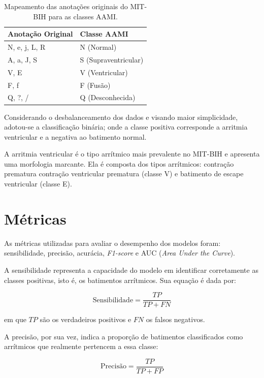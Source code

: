 \documentclass[
    12pt,                %
    openright,           %
    oneside,             %
    a4paper,             %
    brazil               %
]{abntex2}
\begin{document}
\begin{table}[H]
\centering
\caption{Mapeamento das anotações originais do MIT-BIH para as classes AAMI.}
\label{tab:mapeamento_classes}
\begin{tabular}{ll}
\hline
\textbf{Anotação Original} & \textbf{Classe AAMI} \\
\hline
N, e, j, L, R & N (Normal) \\
A, a, J, S & S (Supraventricular) \\
V, E & V (Ventricular) \\
F, f & F (Fusão) \\
Q, ?, / & Q (Desconhecida) \\
\hline
\end{tabular}
\end{table}


Considerando o desbalanceamento dos dados e visando maior simplicidade, adotou-se a classificação binária; onde a classe positiva corresponde a arritmia ventricular e a negativa ao batimento normal.

A arritmia ventricular é o tipo arrítmico mais prevalente no MIT-BIH e apresenta uma morfologia marcante. Ela é composta dos tipos arrítmicos: contração prematura
contração ventricular prematura (classe V) e batimento de escape ventricular (classe E).


\section{Métricas}
\label{sec:metricas}

As métricas utilizadas para avaliar o desempenho dos modelos foram: sensibilidade, precisão, acurácia, \textit{F1-score} e AUC (\textit{Area Under the Curve}).  

A sensibilidade representa a capacidade do modelo em identificar corretamente as classes positivas, isto é, os batimentos arrítmicos. Sua equação é dada por:

\begin{equation}
\text{Sensibilidade} = \frac{TP}{TP + FN}
\end{equation}

em que $TP$ são os verdadeiros positivos e $FN$ os falsos negativos.  

A precisão, por sua vez, indica a proporção de batimentos classificados como arrítmicos que realmente pertencem a essa classe:

\begin{equation}
\text{Precisão} = \frac{TP}{TP + FP}
\end{equation}
\end{document}
